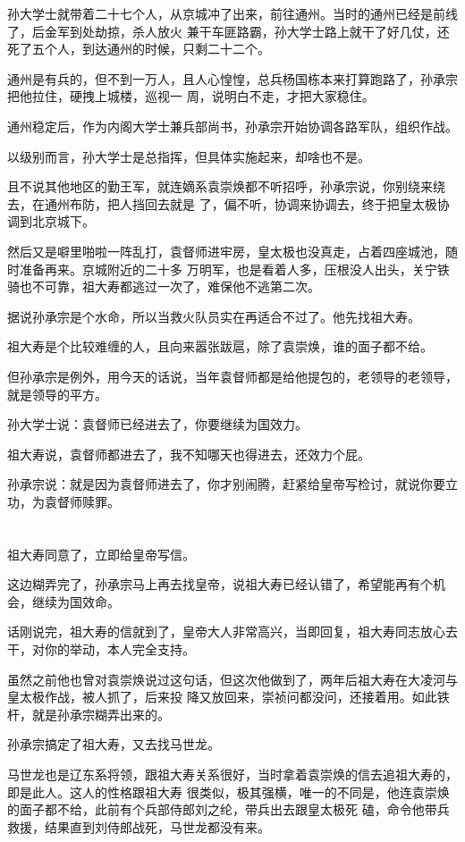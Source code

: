 \documentclass[11pt,a4paper,onecolumn]{article}
\begin{document}
孙大学士就带着二十七个人，从京城冲了出来，前往通州。当时的通州已经是前线了，后金军到处劫掠，杀人放火
兼干车匪路霸，孙大学士路上就干了好几仗，还死了五个人，到达通州的时候，只剩二十二个。

通州是有兵的，但不到一万人，且人心惶惶，总兵杨国栋本来打算跑路了，孙承宗把他拉住，硬拽上城楼，巡视一
周，说明白不走，才把大家稳住。

通州稳定后，作为内阁大学士兼兵部尚书，孙承宗开始协调各路军队，组织作战。

以级别而言，孙大学士是总指挥，但具体实施起来，却啥也不是。

且不说其他地区的勤王军，就连嫡系袁崇焕都不听招呼，孙承宗说，你别绕来绕去，在通州布防，把人挡回去就是
了，偏不听，协调来协调去，终于把皇太极协调到北京城下。

然后又是噼里啪啦一阵乱打，袁督师进牢房，皇太极也没真走，占着四座城池，随时准备再来。京城附近的二十多
万明军，也是看着人多，压根没人出头，关宁铁骑也不可靠，祖大寿都逃过一次了，难保他不逃第二次。

据说孙承宗是个水命，所以当救火队员实在再适合不过了。他先找祖大寿。

祖大寿是个比较难缠的人，且向来嚣张跋扈，除了袁崇焕，谁的面子都不给。

但孙承宗是例外，用今天的话说，当年袁督师都是给他提包的，老领导的老领导，就是领导的平方。

孙大学士说：袁督师已经进去了，你要继续为国效力。

祖大寿说，袁督师都进去了，我不知哪天也得进去，还效力个屁。

孙承宗说：就是因为袁督师进去了，你才别闹腾，赶紧给皇帝写检讨，就说你要立功，为袁督师赎罪。

\section[\thesection]{}

祖大寿同意了，立即给皇帝写信。

这边糊弄完了，孙承宗马上再去找皇帝，说祖大寿已经认错了，希望能再有个机会，继续为国效命。

话刚说完，祖大寿的信就到了，皇帝大人非常高兴，当即回复，祖大寿同志放心去干，对你的举动，本人完全支持。

虽然之前他也曾对袁崇焕说过这句话，但这次他做到了，两年后祖大寿在大凌河与皇太极作战，被人抓了，后来投
降又放回来，崇祯问都没问，还接着用。如此铁杆，就是孙承宗糊弄出来的。

孙承宗搞定了祖大寿，又去找马世龙。

马世龙也是辽东系将领，跟祖大寿关系很好，当时拿着袁崇焕的信去追祖大寿的，即是此人。这人的性格跟祖大寿
很类似，极其强横，唯一的不同是，他连袁崇焕的面子都不给，此前有个兵部侍郎刘之纶，带兵出去跟皇太极死
磕，命令他带兵救援，结果直到刘侍郎战死，马世龙都没有来。
\end{document}
